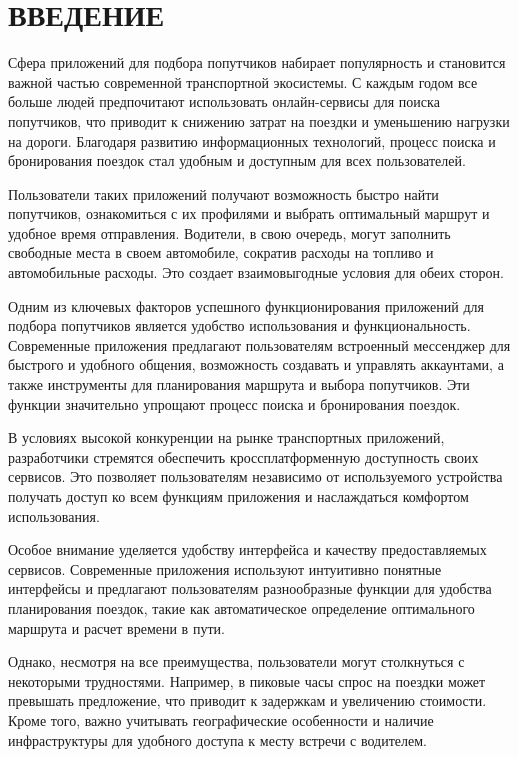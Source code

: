 \section*{ВВЕДЕНИЕ}

Сфера приложений для подбора попутчиков набирает популярность и становится важной частью современной транспортной экосистемы. С каждым годом все больше людей предпочитают использовать онлайн-сервисы для поиска попутчиков, что приводит к снижению затрат на поездки и уменьшению нагрузки на дороги. Благодаря развитию информационных технологий, процесс поиска и бронирования поездок стал удобным и доступным для всех пользователей.

Пользователи таких приложений получают возможность быстро найти попутчиков, ознакомиться с их профилями и выбрать оптимальный маршрут и удобное время отправления. Водители, в свою очередь, могут заполнить свободные места в своем автомобиле, сократив расходы на топливо и автомобильные расходы. Это создает взаимовыгодные условия для обеих сторон.

Одним из ключевых факторов успешного функционирования приложений для подбора попутчиков является удобство использования и функциональность. Современные приложения предлагают пользователям встроенный мессенджер для быстрого и удобного общения, возможность создавать и управлять аккаунтами, а также инструменты для планирования маршрута и выбора попутчиков. Эти функции значительно упрощают процесс поиска и бронирования поездок.

В условиях высокой конкуренции на рынке транспортных приложений, разработчики стремятся обеспечить кроссплатформенную доступность своих сервисов. Это позволяет пользователям независимо от используемого устройства получать доступ ко всем функциям приложения и наслаждаться комфортом использования.

Особое внимание уделяется удобству интерфейса и качеству предоставляемых сервисов. Современные приложения используют интуитивно понятные интерфейсы и предлагают пользователям разнообразные функции для удобства планирования поездок, такие как автоматическое определение оптимального маршрута и расчет времени в пути.

Однако, несмотря на все преимущества, пользователи могут столкнуться с некоторыми трудностями. Например, в пиковые часы спрос на поездки может превышать предложение, что приводит к задержкам и увеличению стоимости. Кроме того, важно учитывать географические особенности и наличие инфраструктуры для удобного доступа к месту встречи с водителем.

